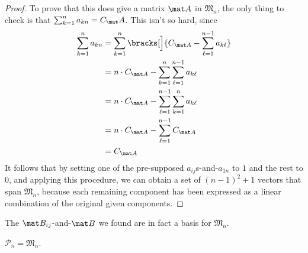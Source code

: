 \documentclass[a4paper,12pt]{article}
\begin{document}
\begin{proof}
 To prove that this does give a matrix \(\mat A\) in \(\mathfrak M_n\), the only
 thing to check is that \(\sum_{k = 1}^n a_{kn} = C_\mat A\). This isn't so
 hard, since
 \begin{align*}
  \sum_{k = 1}^n a_{kn}
   &= \sum_{k = 1}^n \bracks[\Big]{
       C_{\mat A} - \sum_{\ell = 1}^{n - 1} a_{k\ell}} \\
   &= n \cdot C_{\mat A} -
       \sum_{k = 1}^n \sum_{\ell = 1}^{n - 1} a_{k\ell} \\
   &= n \cdot C_{\mat A} -
       \sum_{\ell = 1}^{n - 1} \sum_{k = 1}^n a_{k\ell} \\
   &= n \cdot C_{\mat A} -
       \sum_{\ell = 1}^{n - 1} C_{\mat A} \\
   &= C_{\mat A}
 \end{align*}
 It follows that by setting one of the pre-supposed \(a_{ij}\)s-and-\(a_{1n}\)
 to \(1\) and the rest to \(0\), and applying this procedure, we can obtain a
 set of \((n - 1)^2 + 1\) vectors that span \(\mathfrak M_n\), because each
 remaining component has been expressed as a linear combination of the original
 given components.
\end{proof}
\begin{corollary}
 The \(\mat B_{ij}\)-and-\(\mat B\) we found are in fact a basis for
 \(\mathfrak M_n\).
\end{corollary}
\begin{theorem}
 \(\mathscr P_n = \mathfrak M_n\).
\end{theorem}
\end{document}
